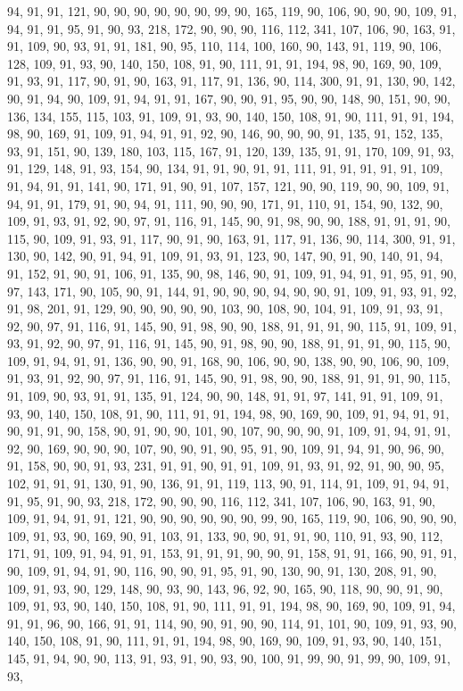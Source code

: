 \begin{sloppypar}
94, 91, 91, 121, 90, 90, 90, 90, 90, 90, 99, 90, 165, 119, 90, 106, 90, 90, 90, 109, 91, 94, 91, 91, 95, 91, 90, 93, 218, 172, 90, 90, 90, 116, 112, 341, 107, 106, 90, 163, 91, 91, 109, 90, 93, 91, 91, 181, 90, 95, 110, 114, 100, 160, 90, 143, 91, 119, 90, 106, 128, 109, 91, 93, 90, 140, 150, 108, 91, 90, 111, 91, 91, 194, 98, 90, 169, 90, 109, 91, 93, 91, 117, 90, 91, 90, 163, 91, 117, 91, 136, 90, 114, 300, 91, 91, 130, 90, 142, 90, 91, 94, 90, 109, 91, 94, 91, 91, 167, 90, 90, 91, 95, 90, 90, 148, 90, 151, 90, 90, 136, 134, 155, 115, 103, 91, 109, 91, 93, 90, 140, 150, 108, 91, 90, 111, 91, 91, 194, 98, 90, 169, 91, 109, 91, 94, 91, 91, 92, 90, 146, 90, 90, 90, 91, 135, 91, 152, 135, 93, 91, 151, 90, 139, 180, 103, 115, 167, 91, 120, 139, 135, 91, 91, 170, 109, 91, 93, 91, 129, 148, 91, 93, 154, 90, 134, 91, 91, 90, 91, 91, 111, 91, 91, 91, 91, 91, 109, 91, 94, 91, 91, 141, 90, 171, 91, 90, 91, 107, 157, 121, 90, 90, 119, 90, 90, 109, 91, 94, 91, 91, 179, 91, 90, 94, 91, 111, 90, 90, 90, 171, 91, 110, 91, 154, 90, 132, 90, 109, 91, 93, 91, 92, 90, 97, 91, 116, 91, 145, 90, 91, 98, 90, 90, 188, 91, 91, 91, 90, 115, 90, 109, 91, 93, 91, 117, 90, 91, 90, 163, 91, 117, 91, 136, 90, 114, 300, 91, 91, 130, 90, 142, 90, 91, 94, 91, 109, 91, 93, 91, 123, 90, 147, 90, 91, 90, 140, 91, 94, 91, 152, 91, 90, 91, 106, 91, 135, 90, 98, 146, 90, 91, 109, 91, 94, 91, 91, 95, 91, 90, 97, 143, 171, 90, 105, 90, 91, 144, 91, 90, 90, 90, 94, 90, 90, 91, 109, 91, 93, 91, 92, 91, 98, 201, 91, 129, 90, 90, 90, 90, 90, 103, 90, 108, 90, 104, 91, 109, 91, 93, 91, 92, 90, 97, 91, 116, 91, 145, 90, 91, 98, 90, 90, 188, 91, 91, 91, 90, 115, 91, 109, 91, 93, 91, 92, 90, 97, 91, 116, 91, 145, 90, 91, 98, 90, 90, 188, 91, 91, 91, 90, 115, 90, 109, 91, 94, 91, 91, 136, 90, 90, 91, 168, 90, 106, 90, 90, 138, 90, 90, 106, 90, 109, 91, 93, 91, 92, 90, 97, 91, 116, 91, 145, 90, 91, 98, 90, 90, 188, 91, 91, 91, 90, 115, 91, 109, 90, 93, 91, 91, 135, 91, 124, 90, 90, 148, 91, 91, 97, 141, 91, 91, 109, 91, 93, 90, 140, 150, 108, 91, 90, 111, 91, 91, 194, 98, 90, 169, 90, 109, 91, 94, 91, 91, 90, 91, 91, 90, 158, 90, 91, 90, 90, 101, 90, 107, 90, 90, 90, 91, 109, 91, 94, 91, 91, 92, 90, 169, 90, 90, 90, 107, 90, 90, 91, 90, 95, 91, 90, 109, 91, 94, 91, 90, 96, 90, 91, 158, 90, 90, 91, 93, 231, 91, 91, 90, 91, 91, 109, 91, 93, 91, 92, 91, 90, 90, 95, 102, 91, 91, 91, 130, 91, 90, 136, 91, 91, 119, 113, 90, 91, 114, 91, 109, 91, 94, 91, 91, 95, 91, 90, 93, 218, 172, 90, 90, 90, 116, 112, 341, 107, 106, 90, 163, 91, 90, 109, 91, 94, 91, 91, 121, 90, 90, 90, 90, 90, 90, 99, 90, 165, 119, 90, 106, 90, 90, 90, 109, 91, 93, 90, 169, 90, 91, 103, 91, 133, 90, 90, 91, 91, 90, 110, 91, 93, 90, 112, 171, 91, 109, 91, 94, 91, 91, 153, 91, 91, 91, 90, 90, 91, 158, 91, 91, 166, 90, 91, 91, 90, 109, 91, 94, 91, 90, 116, 90, 90, 91, 95, 91, 90, 130, 90, 91, 130, 208, 91, 90, 109, 91, 93, 90, 129, 148, 90, 93, 90, 143, 96, 92, 90, 165, 90, 118, 90, 90, 91, 90, 109, 91, 93, 90, 140, 150, 108, 91, 90, 111, 91, 91, 194, 98, 90, 169, 90, 109, 91, 94, 91, 91, 96, 90, 166, 91, 91, 114, 90, 90, 91, 90, 90, 114, 91, 101, 90, 109, 91, 93, 90, 140, 150, 108, 91, 90, 111, 91, 91, 194, 98, 90, 169, 90, 109, 91, 93, 90, 140, 151, 145, 91, 94, 90, 90, 113, 91, 93, 91, 90, 93, 90, 100, 91, 99, 90, 91, 99, 90, 109, 91, 93, 
\end{sloppypar}
